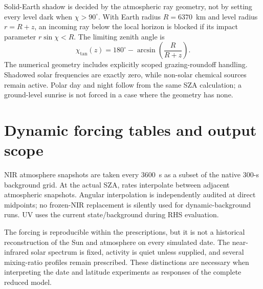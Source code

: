 Solid-Earth shadow is decided by the atmospheric ray geometry, not by setting every level dark when $\chi>90^\circ$. With Earth radius $R=6370$~km and level radius $r=R+z$, an incoming ray below the local horizon is blocked if its impact parameter $r\sin\chi<R$. The limiting zenith angle is
\begin{equation}\chi_{\mathrm{tan}}(z)=180^\circ-\arcsin\left(\frac{R}{R+z}\right).\label{eq:tangent}\end{equation}
The numerical geometry includes explicitly scoped grazing-roundoff handling. Shadowed solar frequencies are exactly zero, while non-solar chemical sources remain active. Polar day and night follow from the same SZA calculation; a ground-level sunrise is not forced in a case where the geometry has none.

\section{Dynamic forcing tables and output scope}
NIR atmosphere snapshots are taken every 3600~s as a subset of the native 300-s background grid. At the actual SZA, rates interpolate between adjacent atmospheric snapshots. Angular interpolation is independently audited at direct midpoints; no frozen-NIR replacement is silently used for dynamic-background runs. UV uses the current state/background during RHS evaluation.

The forcing is reproducible within the prescriptions, but it is not a historical reconstruction of the Sun and atmosphere on every simulated date. The near-infrared solar spectrum is fixed, activity is quiet unless supplied, and several mixing-ratio profiles remain prescribed. These distinctions are necessary when interpreting the date and latitude experiments as responses of the complete reduced model.
